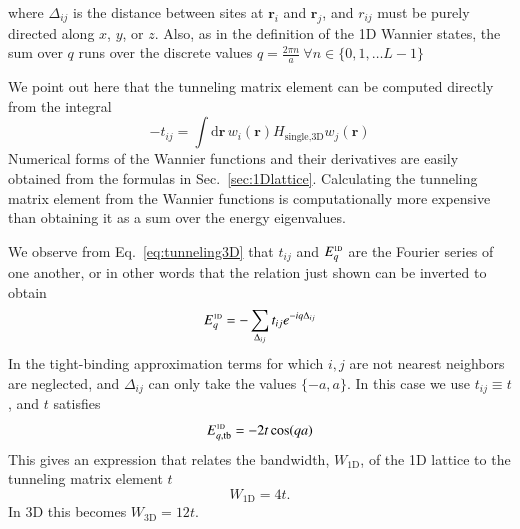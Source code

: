 \documentclass[oneside,11pt]{memoir}
\newcommand{\bv}[1]{\ensuremath{\bm{#1}}}
\begin{document}
where $\Delta_{ij}$ is the distance between sites at $\bv{r}_{i}$ and
$\bv{r}_{j}$, and $r_{ij}$ must be purely directed along $x$, $y$, or $z$.
Also, as in the definition of the 1D Wannier states, the sum over $q$ runs over
the discrete values $q = \frac{2\pi n}{a} \  \forall n \in \lbrace
0,1,\ldots L-1\rbrace$

We point out here that the tunneling matrix element can be computed directly
from the integral \begin{equation}
  -t_{ij} = \int \mathrm{d}\bv{r} \, w_{i}(\bv{r}) H_{\text{single,3D}} w_{j}(\bv{r}) 
\end{equation}
Numerical forms of the Wannier functions and their derivatives are easily
obtained from the formulas in Sec.~\ref{sec:1Dlattice}.   Calculating the
tunneling matrix element from the Wannier functions is computationally more
expensive than obtaining it as a sum over the energy eigenvalues. 

We observe from Eq.~\ref{eq:tunneling3D} that $t_{ij}$ and $E_{q}^{\text{\tiny
1D}}$ are the Fourier series of one another, or in other words that the
relation just shown can be inverted to obtain 
\begin{equation} 
  E_{q}^{\text{\tiny 1D}} = - \sum_{\Delta_{ij}} t_{ij} e^{-iq \Delta_{ij}} 
\end{equation}
In the tight-binding approximation terms for which $i,j$ are not nearest
neighbors are neglected, and  $\Delta_{ij}$ can only take the values $\lbrace
-a, a \rbrace$.  In this case we use $t_{ij}\equiv t$, and $t$ satisfies
\begin{equation}
  E_{q,\text{tb}}^{\text{\tiny 1D}} = -2 t\cos( qa) 
\end{equation}
This gives an expression that relates the bandwidth, $W_{\text{1D}}$, of the 1D
lattice to the tunneling matrix element $t$ 
\begin{equation} W_{\text{1D}}=4t.\end{equation}  
In 3D this becomes
$W_{\text{3D}}= 12t$.
\end{document}

